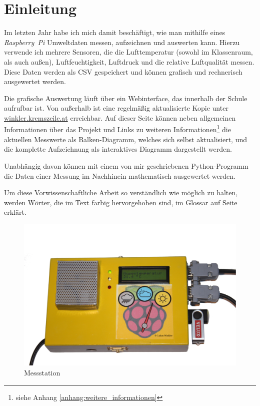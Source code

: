 \chapter{Einleitung}
Im letzten Jahr habe ich mich damit beschäftigt, wie man mithilfe eines \emph{Rasp\-berry~Pi} Umweltdaten messen, aufzeichnen und auswerten kann. Hierzu verwende ich mehrere Sensoren, die die Lufttemperatur (sowohl im Klassenraum, als auch außen), Luftfeuchtigkeit, Luftdruck und die relative Luftqualität messen. Diese Daten werden als \gls{CSV} gespeichert und können grafisch und rechnerisch ausgewertet werden. 

Die grafische Auswertung läuft über ein Webinterface, das innerhalb der Schule aufrufbar ist. Von außerhalb ist eine regelmäßig aktualisierte Kopie unter \href{http://winkler.kremszeile.at/}{winkler.kremszeile.at} erreichbar. Auf dieser Seite können neben allgemeinen Informationen über das Projekt und Links zu weiteren Informationen\footnote{siehe Anhang \ref{anhang:weitere_informationen}} die aktuellen Messwerte als Balken-Diagramm, welches sich selbst aktualisiert, und die komplette Aufzeichnung als interaktives Diagramm dargestellt werden.

Unabhängig davon können mit einem von mir geschriebenen \gls{Python}-Programm die Daten einer Messung im Nachhinein mathematisch ausgewertet werden.

Um diese Vorwissenschaftliche Arbeit so verständlich wie möglich zu halten, werden Wörter, die im Text farbig hervorgehoben sind, im Glossar auf Seite \pageref{main} erklärt.

\begin{figure}[h]
  \centering
     \includegraphics[width=\textwidth]{figures/gesamt.png}
  \caption{Messstation}
  \label{fig:gesamt}
\end{figure}